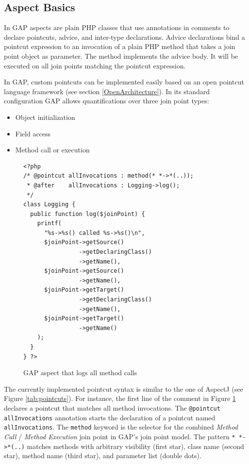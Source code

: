 \documentclass{acm_proc_article-sp}
\begin{document}

\subsection{Aspect Basics}

In GAP aspects are plain PHP classes that use annotations in
comments to declare pointcuts, advice, and inter-type
declarations. Advice declarations bind a pointcut expression to an
invocation of a plain PHP method that takes a join point object as
parameter. The method implements the advice body. It will be
executed on all join points matching the pointcut expression.

In GAP, custom pointcuts can be implemented easily based on an
open pointcut language framework (see section
\ref{OpenArchitecture}). In its standard configuration GAP allows
quantifications over three join point types:
\begin{itemize}
  \item Object initialization
  \item Field access
  \item Method call or execution
\end{itemize}


\begin{figure}[thb]
\centering \small{%
\begin{verbatim}
<?php
/* @pointcut allInvocations : method(* *->*(..));
 * @after    allInvocations : Logging->log();
 */
class Logging {
  public function log($joinPoint) {
    printf(
      "%s->%s() called %s->%s()\n",
      $joinPoint->getSource()
                ->getDeclaringClass()
                ->getName(),
      $joinPoint->getSource()
                ->getName(),
      $joinPoint->getTarget()
                ->getDeclaringClass()
                ->getName(),
      $joinPoint->getTarget()
                ->getName()
    );
  }
} ?>
\end{verbatim}}
\caption{GAP aspect that logs all method calls}
\label{LoggingAspect}
\end{figure}

The currently implemented pointcut syntax is similar to the one of
AspectJ (see Figure \ref{tab:pointcuts}).
For instance, the first line of the comment in Figure
\ref{LoggingAspect} declares a pointcut that matches all method
invocations. The \texttt{@pointcut allInvocations} annotation
starts the declaration of a pointcut named
\texttt{allInvoca\-tions}. The \texttt{method} keyword is the
selector for the combined \emph{Method Call} / \emph{Method
Execution} join point in GAP's join point model. The pattern
\texttt{* *->*(..)} matches methods with arbitrary visibility
(first star), class name (second star), method name (third star),
and parameter list (double dots).
\end{document}
